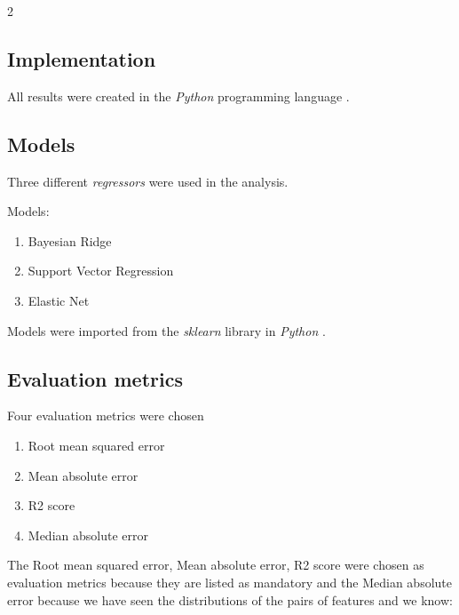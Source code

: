 \documentclass[12pt, a4paper]{article}
\begin{document}
\begin{multicols}{2}
    \subsection{Implementation} \label{subsec:impl}

    All results were created in the \textit{Python} programming language \cite{noauthor_3132_nodate}.
    \newline

    \subsection{Models} \label{subsec:models}

    Three different \textit{regressors} were used in the analysis.
    \newline

    Models:
    \newline

    \begin{enumerate} \label{enm:models}
        \item Bayesian Ridge
        \item Support Vector Regression
        \item Elastic Net
    \end{enumerate}

    Models were imported from the \textit{sklearn} \cite{noauthor_scikit-learn_nodate} library in \textit{Python} \cite{noauthor_3132_nodate}.
    \newline

    \subsection{Evaluation metrics} \label{subsec:metrics}

    Four evaluation metrics were chosen
    \newline

    \begin{enumerate} \label{enm:metrics}
        \item Root mean squared error
        \item Mean absolute error
        \item R2 score
        \item Median absolute error
    \end{enumerate}

    The Root mean squared error, Mean absolute error, R2 score were chosen as evaluation metrics because they are listed as mandatory and the Median absolute error because we have seen the distributions of the pairs of features and we know:
    \newline


\end{multicols}
\end{document}
